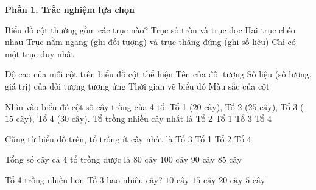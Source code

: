 \textbf{Phần 1. Trắc nghiệm lựa chọn}

\begin{ex} %
Biểu đồ cột thường gồm các trục nào?
\choice
{Trục số tròn và trục dọc}
{Hai trục chéo nhau}
{\True Trục nằm ngang (ghi đối tượng) và trục thẳng đứng (ghi số liệu)}
{Chỉ có một trục duy nhất}
\end{ex}

\begin{ex} %
Độ cao của mỗi cột trên biểu đồ cột thể hiện
\choice
{Tên của đối tượng}
{\True Số liệu (số lượng, giá trị) của đối tượng tương ứng}
{Thời gian vẽ biểu đồ}
{Màu sắc của cột}
\end{ex}

\begin{ex} %
Nhìn vào biểu đồ cột số cây trồng của 4 tổ: Tổ 1 ($20\text{ cây}$), Tổ 2 ($25\text{ cây}$), Tổ 3 ($15\text{ cây}$), Tổ 4 ($30\text{ cây}$). Tổ trồng nhiều cây nhất là
\choice
{Tổ 2}
{Tổ 1}
{Tổ 3}
{\True Tổ 4}
\end{ex}

\begin{ex} %
Cũng từ biểu đồ trên, tổ trồng ít cây nhất là
\choice
{\True Tổ 3}
{Tổ 1}
{Tổ 2}
{Tổ 4}
\end{ex}

\begin{ex} %
Tổng số cây cả 4 tổ trồng được là
\choice
{$80\text{ cây}$}
{$100\text{ cây}$}
{\True $90\text{ cây}$}
{$85\text{ cây}$}
\end{ex}

\begin{ex} %
Tổ 4 trồng nhiều hơn Tổ 3 bao nhiêu cây?
\choice
{$10\text{ cây}$}
{\True $15\text{ cây}$}
{$20\text{ cây}$}
{$5\text{ cây}$}
\end{ex}

